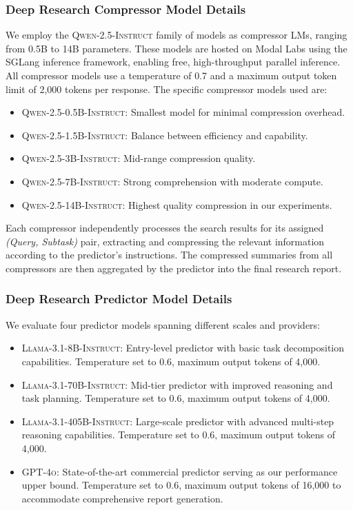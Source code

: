 \documentclass{article} %
\begin{document}
\subsubsection{Deep Research Compressor Model Details}
\label{sec:appendix-deepresearch-compressors}
We employ the \textsc{Qwen-2.5-Instruct} family of models as compressor LMs, ranging from 0.5B to 14B parameters. These models are hosted on Modal Labs using the SGLang inference framework, enabling free, high-throughput parallel inference. All compressor models use a temperature of 0.7 and a maximum output token limit of 2,000 tokens per response. The specific compressor models used are: 
\begin{itemize}[leftmargin=0.2in]
    \item \textsc{Qwen-2.5-0.5B-Instruct}: Smallest model for minimal compression overhead.
    \item \textsc{Qwen-2.5-1.5B-Instruct}: Balance between efficiency and capability.
    \item \textsc{Qwen-2.5-3B-Instruct}: Mid-range compression quality.
    \item \textsc{Qwen-2.5-7B-Instruct}: Strong comprehension with moderate compute.
    \item \textsc{Qwen-2.5-14B-Instruct}: Highest quality compression in our experiments.
\end{itemize}
Each compressor independently processes the search results for its assigned \emph{(Query, Subtask)} pair, extracting and compressing the relevant information according to the predictor's instructions. The compressed summaries from all compressors are then aggregated by the predictor into the final research report.

\subsubsection{Deep Research Predictor Model Details}
\label{sec:appendix-deepresearch-predictors}
We evaluate four predictor models spanning different scales and providers:

\begin{itemize}[leftmargin=0.2in]
    \item \textsc{Llama-3.1-8B-Instruct}: Entry-level predictor with basic task decomposition capabilities. Temperature set to 0.6, maximum output tokens of 4,000.
    \item \textsc{Llama-3.1-70B-Instruct}: Mid-tier predictor with improved reasoning and task planning. Temperature set to 0.6, maximum output tokens of 4,000.
    \item \textsc{Llama-3.1-405B-Instruct}: Large-scale predictor with advanced multi-step reasoning capabilities. Temperature set to 0.6, maximum output tokens of 4,000.
    \item \textsc{GPT-4o}: State-of-the-art commercial predictor serving as our performance upper bound. Temperature set to 0.6, maximum output tokens of 16,000 to accommodate comprehensive report generation.
\end{itemize}
\end{document}
